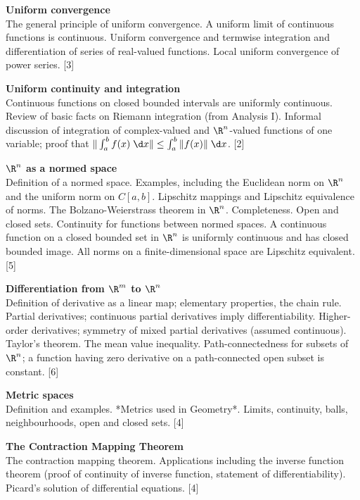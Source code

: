 \documentclass[a4paper]{article}
\begin{document}
\maketitle
{\small
\noindent\textbf{Uniform convergence}\\
The general principle of uniform convergence. A uniform limit of continuous functions is continuous. Uniform convergence and termwise integration and differentiation of series of real-valued functions. Local uniform convergence of power series.\hspace*{\fill} [3]

\vspace{10pt}
\noindent\textbf{Uniform continuity and integration}\\
Continuous functions on closed bounded intervals are uniformly continuous. Review of basic facts on Riemann integration (from Analysis I). Informal discussion of integration of complex-valued and $\R^n$-valued functions of one variable; proof that $\|\int_a^b f(x) \;\d x\| \leq \int_a^b \|f(x)\|\;\d x$.\hspace*{\fill} [2]

\vspace{10pt}
\noindent\textbf{$\R^n$ as a normed space}\\
Definition of a normed space. Examples, including the Euclidean norm on $\R^n$ and the uniform norm on $C[a, b]$. Lipschitz mappings and Lipschitz equivalence of norms. The Bolzano-Weierstrass theorem in $\R^n$. Completeness. Open and closed sets. Continuity for functions between normed spaces. A continuous function on a closed bounded set in $\R^n$ is uniformly continuous and has closed bounded image. All norms on a finite-dimensional space are Lipschitz equivalent.\hspace*{\fill} [5]

\vspace{10pt}
\noindent\textbf{Differentiation from $\R^m$ to $\R^n$}\\
Definition of derivative as a linear map; elementary properties, the chain rule. Partial derivatives; continuous partial derivatives imply differentiability. Higher-order derivatives; symmetry of mixed partial derivatives (assumed continuous). Taylor's theorem. The mean value inequality. Path-connectedness for subsets of $\R^n$; a function having zero derivative on a path-connected open subset is constant.\hspace*{\fill} [6]

\vspace{10pt}
\noindent\textbf{Metric spaces}\\
Definition and examples. *Metrics used in Geometry*. Limits, continuity, balls, neighbourhoods, open and closed sets.\hspace*{\fill} [4]

\vspace{10pt}
\noindent\textbf{The Contraction Mapping Theorem}\\
The contraction mapping theorem. Applications including the inverse function theorem (proof of continuity of inverse function, statement of differentiability). Picard's solution of differential equations.\hspace*{\fill} [4]}
\end{document}
